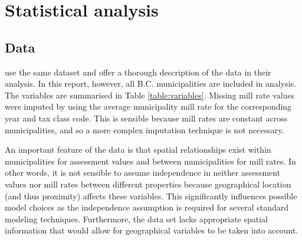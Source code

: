 \documentclass{article}
\begin{document}
\section{Statistical analysis} \label{section:analysis}

\subsection{Data} \label{sec:data}

\citet{s450-report} use the same dataset and offer a thorough description of the data in their analysis. In this report, however, all B.C. municipalities are included in analysis. The variables are summarised in Table \ref{table:variables}.  Missing mill rate values were imputed by using the average municipality mill rate for the corresponding year and tax class code. This is sensible because mill rates are constant across municipalities, and so a more complex imputation technique is not necessary.

An important feature of the data is that spatial relationships exist within municipalities for assessment values and between municipalities for mill rates.  In other words, it is not sensible to assume independence in neither assessment values nor mill rates between different properties because geographical location (and thus proximity) affects these variables. This significantly influences possible model choices as the independence assumption is required for several standard modeling techniques. Furthermore, the data set lacks appropriate spatial information that would allow for geographical variables to be taken into account.
\end{document}
